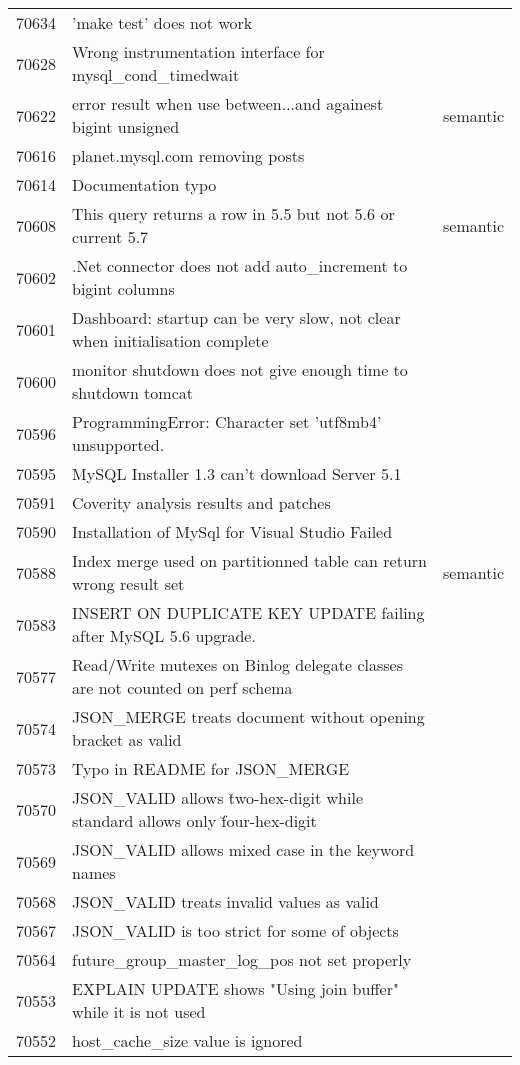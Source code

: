 \begin{longtable}[c]{p{1cm}p{10cm}p{1cm}}
70634 & 'make test' does not work &  \\
70628 & Wrong instrumentation interface for mysql\_cond\_timedwait &  \\
70622 & error result when use between...and againest bigint unsigned & semantic \\
70616 & planet.mysql.com removing posts &  \\
70614 & Documentation typo &  \\
70608 & This query returns a row in 5.5 but not 5.6 or current 5.7 & semantic \\
70602 & .Net connector does not add auto\_increment to bigint columns &  \\
70601 & Dashboard: startup can be very slow, not clear when initialisation complete &  \\
70600 & monitor shutdown does not give enough time to shutdown tomcat &  \\
70596 & ProgrammingError: Character set 'utf8mb4' unsupported. &  \\
70595 & MySQL Installer 1.3 can't download Server 5.1 &  \\
70591 & Coverity analysis results and patches &  \\
70590 & Installation of MySql for Visual Studio Failed &  \\
70588 & Index merge used on partitionned table can return wrong result set & semantic \\
70583 & INSERT ON DUPLICATE KEY UPDATE failing after MySQL 5.6 upgrade. &  \\
70577 & Read/Write mutexes on Binlog delegate classes are not counted on perf schema &  \\
70574 & JSON\_MERGE treats document without opening bracket as valid &  \\
70573 & Typo in README for JSON\_MERGE &  \\
70570 & JSON\_VALID allows \u two-hex-digit while standard allows only \u four-hex-digit &  \\
70569 & JSON\_VALID allows mixed case in the keyword names &  \\
70568 & JSON\_VALID treats invalid values as valid &  \\
70567 & JSON\_VALID is too strict for some of objects &  \\
70564 & future\_group\_master\_log\_pos not set properly &  \\
70553 & EXPLAIN UPDATE shows "Using join buffer" while it is not used &  \\
70552 & host\_cache\_size value is ignored &  \\

\end{longtable}
